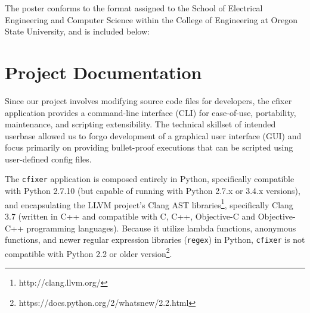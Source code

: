 \documentclass[11pt]{scrreprt}
\begin{document}
The poster conforms to the format assigned to the School of Electrical Engineering and Computer Science within the College of Engineering at Oregon State University, and is included below:
\begin{figure}[ht]
  \label{fig:poster}
\end{figure}

\chapter{Project Documentation}

Since our project involves modifying source code files for developers, the cfixer application provides a command-line interface (CLI) for ease-of-use, portability, maintenance, and scripting extensibility.
The technical skillset of intended userbase allowed us to forgo development of a graphical user interface (GUI) and focus primarily on providing bullet-proof executions that can be scripted using user-defined config files.

The \texttt{cfixer} application is composed entirely in Python, specifically compatible with Python 2.7.10 (but capable of running with Python 2.7.x or 3.4.x versions), and encapsulating the LLVM project's Clang AST libraries\footnote{http://clang.llvm.org/}, specifically Clang 3.7 (written in C++ and compatible with C, C++, Objective-C and Objective-C++ programming languages).
Because it utilize lambda functions, anonymous functions, and newer regular expression libraries (\texttt{regex}) in Python, \texttt{cfixer} is not compatible with Python 2.2 or older version\footnote{https://docs.python.org/2/whatsnew/2.2.html}.
\end{document}
